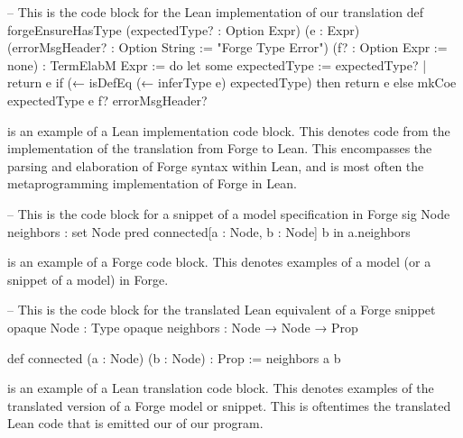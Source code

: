 \begin{leanimpl}
-- This is the code block for the Lean implementation of our translation
def forgeEnsureHasType (expectedType? : Option Expr) (e : Expr)
    (errorMsgHeader? : Option String := "Forge Type Error") 
    (f? : Option Expr := none) : TermElabM Expr := do
  let some expectedType := expectedType? | return e
  if (← isDefEq (← inferType e) expectedType) then
    return e
  else
    mkCoe expectedType e f? errorMsgHeader?
\end{leanimpl}
is an example of a Lean implementation code block. This denotes code from the implementation of the translation from Forge to Lean. This encompasses the parsing and elaboration of Forge syntax within Lean, and is most often the metaprogramming implementation of Forge in Lean. 

\begin{forge}
-- This is the code block for a snippet of a model specification in Forge
sig Node {
  neighbors : set Node
}
pred connected[a : Node, b : Node] {
  b in a.neighbors
}
\end{forge}
is an example of a Forge code block. This denotes examples of a model (or a snippet of a model) in Forge. 

\begin{lean}
-- This is the code block for the translated Lean equivalent of a Forge snippet
opaque Node : Type
opaque neighbors : Node → Node → Prop

def connected (a : Node) (b : Node) : Prop :=
  neighbors a b
\end{lean}
is an example of a Lean translation code block. This denotes examples of the translated version of a Forge model or snippet. This is oftentimes the translated Lean code that is emitted our of our program. 

\newpage
